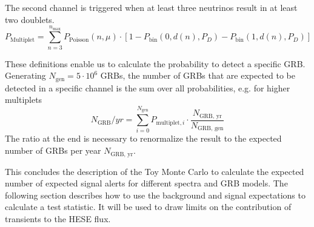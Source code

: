 The second channel is triggered when at least three neutrinos 
result in at least two doublets.
\begin{equation}
 P_\text{Multiplet} = \sum_{n=3}^{n_\text{max}} P_\text{Poisson}(n, 
\mu) \cdot [1 - P_\text{bin} (0, d(n), P_D) - P_\text{bin} (1, 
d(n), P_D)]
\end{equation}

These definitions enable us to calculate the probability to detect a specific 
GRB. Generating $N_\text{gen} = 5\cdot10^6$ GRBs, the number of GRBs that are 
expected to be detected
in a specific channel is the sum over all probabilities, e.g. for higher 
multiplets
\begin{equation}
 N_\text{GRB} / yr = \sum_{i=0}^{N_\text{gen}} P_{\text{multiplet},i} \cdot 
\frac{N_\text{GRB, yr}}{N_\text{GRB, gen}}
\end{equation}
The ratio at the end is necessary to renormalize the result to the expected 
number of 
GRBs per year $N_\text{GRB, yr}$.

This concludes the description of the Toy Monte Carlo to calculate the expected 
number of expected signal alerts for different spectra and GRB models. The 
following section describes how to use the background and signal expectations 
 to calculate a test statistic. It will be used to draw limits on the 
contribution of transients to the HESE flux.
